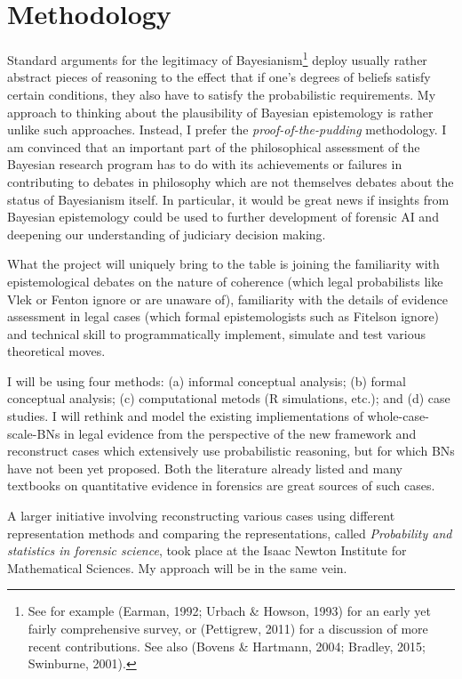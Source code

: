 \documentclass[11pt,dvipsnames,enabledeprecatedfontcommands]{scrartcl}
\begin{document}
\section{Methodology}\label{methodology}

Standard arguments for the legitimacy of Bayesianism\footnote{See for
  example (Earman, 1992; Urbach \& Howson, 1993) for an early yet fairly
  comprehensive survey, or (Pettigrew, 2011) for a discussion of more
  recent contributions. See also (Bovens \& Hartmann, 2004; Bradley,
  2015; Swinburne, 2001).} deploy usually rather abstract pieces of
reasoning to the effect that if one's degrees of beliefs satisfy certain
conditions, they also have to satisfy the probabilistic requirements. My
approach to thinking about the plausibility of Bayesian epistemology is
rather unlike such approaches. Instead, I prefer the
\emph{proof-of-the-pudding} methodology. I am convinced that an
important part of the philosophical assessment of the Bayesian research
program has to do with its achievements or failures in contributing to
debates in philosophy which are not themselves debates about the status
of Bayesianism itself. In particular, it would be great news if insights
from Bayesian epistemology could be used to further development of
forensic AI and deepening our understanding of judiciary decision
making.

What the project will uniquely bring to the table is joining the
familiarity with epistemological debates on the nature of coherence
(which legal probabilists like Vlek or Fenton ignore or are unaware of),
familiarity with the details of evidence assessment in legal cases
(which formal epistemologists such as Fitelson ignore) and technical
skill to programmatically implement, simulate and test various
theoretical moves.

I will be using four methods: (a) informal conceptual analysis; (b)
formal conceptual analysis; (c) computational metods (R simulations,
etc.); and (d) case studies. I will rethink and model the existing
impliementations of whole-case-scale-BNs in legal evidence from the
perspective of the new framework and reconstruct cases which extensively
use probabilistic reasoning, but for which BNs have not been yet
proposed. Both the literature already listed and many textbooks on
quantitative evidence in forensics are great sources of such cases.

A larger initiative involving reconstructing various cases using
different representation methods and comparing the representations,
called \emph{Probability and statistics in forensic science}, took place
at the Isaac Newton Institute for Mathematical Sciences. My approach
will be in the same vein.
\end{document}
